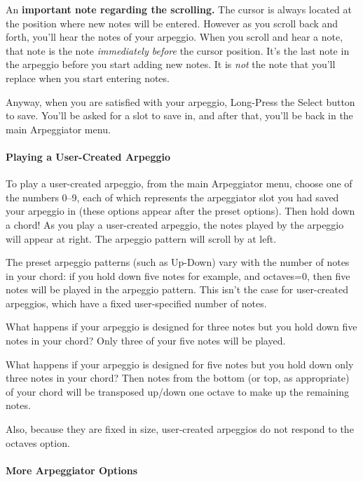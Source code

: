\documentclass{article}
\begin{document}
An {\bf important note regarding the scrolling.}  The cursor is always located at the position where new notes will be entered.  However as you scroll back and forth, you'll hear the notes of your arpeggio.  When you scroll and hear a note, that note is the note {\it immediately before} the cursor position.  It's the last note in the arpeggio before you start adding new notes. It is {\it not} the note that you'll replace when you start entering notes. 

Anyway, when you are satisfied with your arpeggio, Long-Press the Select button to save.  You'll be asked for a slot to save in, and after that, you'll be back in the main Arpeggiator menu.

\paragraph{Playing a User-Created Arpeggio}

To play a user-created arpeggio, from the main Arpeggiator menu, choose one of the numbers 0--9, each of which represents the arpeggiator slot you had saved your arpeggio in (these options appear after the preset options).  Then hold down a chord!  As you play a user-created arpeggio, the notes played by the arpeggio will appear at right.  The arpeggio pattern will scroll by at left.


The preset arpeggio patterns (such as Up-Down) vary with the number of notes in your chord: if you hold down five notes for example, and octaves=0, then five notes will be played in the arpeggio pattern.  This isn't the case for user-created arpeggios, which have a fixed user-specified number of notes.

What happens if your arpeggio is designed for three notes but you hold down  five notes in your chord?  Only three of your five notes will be played.

What happens if your arpeggio is designed for five notes but you hold down only three notes in your chord?  Then notes from the bottom (or top, as appropriate) of your chord will be transposed up/down one octave to make up the remaining notes.

Also, because they are fixed in size, user-created arpeggios do not respond to the octaves option.

\paragraph{More Arpeggiator Options}
\end{document}
